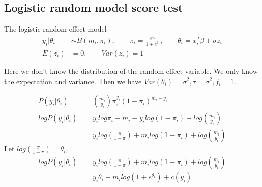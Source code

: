 \documentclass[11pt]{article} %
\begin{document}
\subsection{Logistic random model score test}
The logistic random effect model
\begin{align*}
	y_i|\theta_i & \sim B(m_i, \pi_i), \qquad \pi_i = \frac{e^{\theta_i}}{1+e^{\theta_i}} ,\qquad \theta_i = x_i^T \beta + \sigma z_i\\
	E(z_i) &= 0, \qquad Var(z_i) = 1
\end{align*}

Here we don't know the distribution of the random effect variable. We only know the expectation and variance.
Then we have $Var(\theta_i) = \sigma^2, \tau = \sigma^2, f_i = 1$.

\begin{align*}
	P(y_i|\theta_i) &= {m_i \choose y_i} \pi_i^{y_i} (1-\pi_i)^{m_i-y_i}\\
	log P(y_i|\theta_i) &= y_i log \pi_i + {m_i-y_i} log (1-\pi_i) + log {m_i \choose y_i}\\
	&= y_i log(\frac{\pi}{1-\pi}) + m_i log (1-\pi_i) + log {m_i \choose y_i}
\end{align*}
Let $log(\frac{\pi}{1-\pi}) = \theta_i$,
\begin{align*}
	log P(y_i|\theta_i) &=  y_i log(\frac{\pi}{1-\pi}) + m_i log (1-\pi_i) + log {m_i \choose y_i}\\
	&= y_i \theta_i - m_i log(1+ e^{\theta_i}) + c(y_i)
\end{align*}
\end{document}
